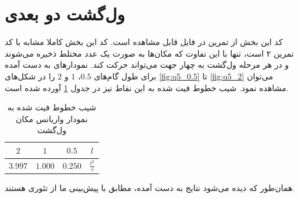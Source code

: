 \documentclass[11pt, a4paper]{article}
\begin{document}
\section{\textbf{ول‌گشت دو بعدی}}
کد این بخش از تمرین در فایل
قابل مشاهده است.
کد این بخش کاملا مشابه با کد تمرین ۲ است،
تنها با این تفاوت که مکان‌ها به صورت یک عدد مختلط ذخیره می‌شوند
و در هر مرحله ول‌گشت به چهار جهت می‌تواند حرکت کند.
نمودار‌های به دست آمده برای طول گام‌های
$0.5$،
$1$
و
$2$
را در شکل‌های
\ref{fig:q5_0.5}
تا
\ref{fig:q5_2}
می‌توان مشاهده نمود.
شیب خطوط فیت شده به این نقاط نیز در جدول
\ref{tab:q5_slopes}
آورده شده است.

\begin{table}[h!]
  \centering
  \begin{tabular}{|c|c|c|c|}
    \hline
    $2$ & $1$ & $0.5$ & $l$ \\ \hline
    $3.997$ & $1.000$ & $0.250$ & $\frac{l^2}{\tau}$ \\ \hline
  \end{tabular}
  \caption{شیب خطوط فیت شده به نمودار‌ واریانس مکان ول‌گشت}
  \label{tab:q5_slopes}
\end{table}

همان‌طور که دیده می‌شود نتایج به دست آمده، مطابق با پیش‌بینی ما از تئوری هستند.
\end{document}
